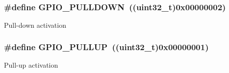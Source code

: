 \subsubsection[{\texorpdfstring{G\+P\+I\+O\+\_\+\+P\+U\+L\+L\+D\+O\+WN}{GPIO_PULLDOWN}}]{\setlength{\rightskip}{0pt plus 5cm}\#define G\+P\+I\+O\+\_\+\+P\+U\+L\+L\+D\+O\+WN~((uint32\+\_\+t)0x00000002)}\hypertarget{group___g_p_i_o__pull__define_ga75d958d0410c36da7f27d1f4f5c36c14}{}\label{group___g_p_i_o__pull__define_ga75d958d0410c36da7f27d1f4f5c36c14}
Pull-\/down activation 
\subsubsection[{\texorpdfstring{G\+P\+I\+O\+\_\+\+P\+U\+L\+L\+UP}{GPIO_PULLUP}}]{\setlength{\rightskip}{0pt plus 5cm}\#define G\+P\+I\+O\+\_\+\+P\+U\+L\+L\+UP~((uint32\+\_\+t)0x00000001)}\hypertarget{group___g_p_i_o__pull__define_gae689bc8f5c42d6df7bd54a8dd372e072}{}\label{group___g_p_i_o__pull__define_gae689bc8f5c42d6df7bd54a8dd372e072}
Pull-\/up activation 